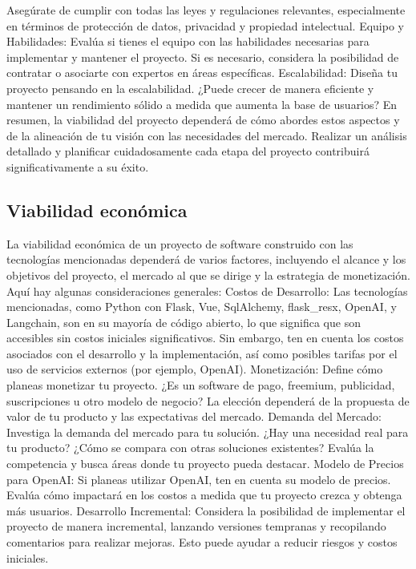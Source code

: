 Asegúrate de cumplir con todas las leyes y regulaciones relevantes, especialmente en términos de protección de datos, privacidad y propiedad intelectual.
Equipo y Habilidades:
Evalúa si tienes el equipo con las habilidades necesarias para implementar y mantener el proyecto. Si es necesario, considera la posibilidad de contratar o asociarte con expertos en áreas específicas.
Escalabilidad:
Diseña tu proyecto pensando en la escalabilidad. ¿Puede crecer de manera eficiente y mantener un rendimiento sólido a medida que aumenta la base de usuarios?
En resumen, la viabilidad del proyecto dependerá de cómo abordes estos aspectos y de la alineación de tu visión con las necesidades del mercado. Realizar un análisis detallado y planificar cuidadosamente cada etapa del proyecto contribuirá significativamente a su éxito.

\subsection{Viabilidad económica}
La viabilidad económica de un proyecto de software construido con las tecnologías 
mencionadas dependerá de varios factores, incluyendo el alcance y los objetivos del proyecto, 
el mercado al que se dirige y la estrategia de monetización. Aquí hay algunas consideraciones generales:
Costos de Desarrollo:
Las tecnologías mencionadas, como Python con Flask, Vue, SqlAlchemy, flask\_resx, OpenAI, y Langchain, 
son en su mayoría de código abierto, lo que significa que son accesibles sin costos iniciales significativos. 
Sin embargo, ten en cuenta los costos asociados con el desarrollo y la implementación, 
así como posibles tarifas por el uso de servicios externos (por ejemplo, OpenAI).
Monetización:
Define cómo planeas monetizar tu proyecto. ¿Es un software de pago, 
freemium, publicidad, suscripciones u otro modelo de negocio? 
La elección dependerá de la propuesta de valor de tu producto y las expectativas del mercado.
Demanda del Mercado:
Investiga la demanda del mercado para tu solución. 
¿Hay una necesidad real para tu producto? 
¿Cómo se compara con otras soluciones existentes? 
Evalúa la competencia y busca áreas donde tu proyecto pueda destacar.
Modelo de Precios para OpenAI:
Si planeas utilizar OpenAI, ten en cuenta su modelo de precios. 
Evalúa cómo impactará en los costos a medida que tu proyecto crezca y obtenga más usuarios.
Desarrollo Incremental:
Considera la posibilidad de implementar el proyecto de manera incremental, 
lanzando versiones tempranas y recopilando comentarios para realizar mejoras. 
Esto puede ayudar a reducir riesgos y costos iniciales.
